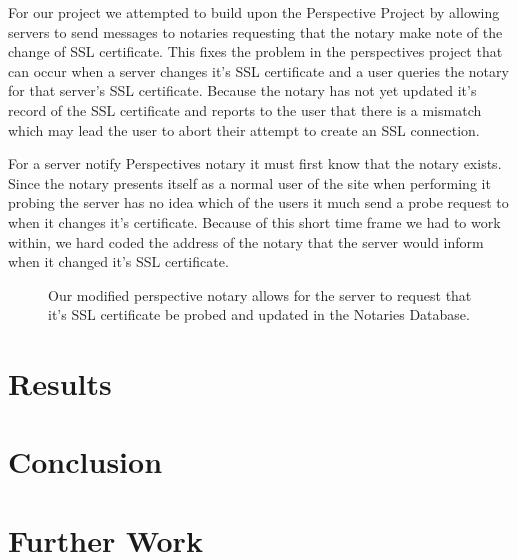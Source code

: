 \documentclass[preprint,review,12pt]{elsarticle}
\begin{document}
For our project we attempted to build upon the Perspective Project by allowing
servers to send messages to notaries requesting that the notary make note of
the change of SSL certificate. This fixes the problem in the perspectives
project that can occur when a server changes it's SSL certificate and a user
queries the notary for that server's SSL certificate. Because the notary has
not yet updated it's record of the SSL certificate and reports to the user that
there is a mismatch which may lead the user to abort their attempt to create an
SSL connection.

For a server notify Perspectives notary it must first know that the notary
exists. Since the notary presents itself as a normal user of the site when
performing it probing the server has no idea which of the users it much send a
probe request to when it changes it's certificate. Because of this short time
frame we had to work within, we hard coded the address of the notary that the
server would inform when it changed it's SSL certificate.

\begin{figure}[h]
\caption{Our modified perspective notary allows for the server to request that
    it's SSL certificate be probed and updated in the Notaries Database.}
\end{figure}

\section{Results}
\label{results}

\section{Conclusion}
\label{conclusion}

\section{Further Work}
\label{further work}
\end{document}
